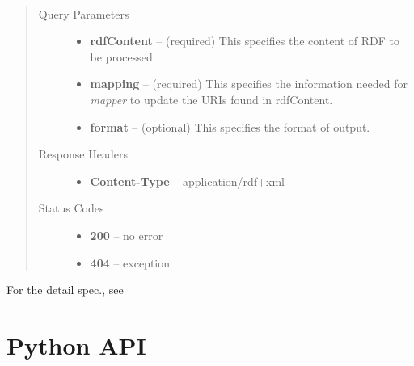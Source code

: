 \documentclass[letterpaper,10pt,english]{sphinxmanual}
\begin{document}
\begin{fulllineitems}
\label{api_ref:post--mapper_?rdfContent, mapping, format_}~\begin{quote}\begin{description}
\item[{Query Parameters}] \leavevmode\begin{itemize}
\item {} 
\textbf{rdfContent} -- (required) This specifies the content of RDF to be processed.

\item {} 
\textbf{mapping} -- (required) This specifies the information needed for \emph{mapper} to update the URIs found in rdfContent.

\item {} 
\textbf{format} -- (optional) This specifies the format of output.

\end{itemize}

\item[{Response Headers}] \leavevmode\begin{itemize}
\item {} 
\textbf{Content-Type} -- application/rdf+xml

\end{itemize}

\item[{Status Codes}] \leavevmode\begin{itemize}
\item {} 
\textbf{200} -- no error

\item {} 
\textbf{404} -- exception

\end{itemize}

\end{description}\end{quote}

\end{fulllineitems}


For the detail spec., see 


\section{Python API}
\label{api_ref:python-api}
\end{document}
